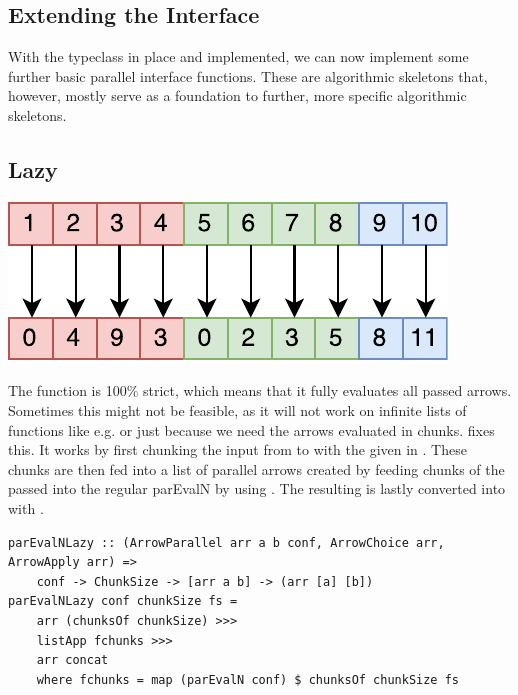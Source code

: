\subsection{Extending the Interface}
\label{sec:extending-interface}
With the  typeclass in place and implemented, we can now implement some further basic parallel interface functions. These are algorithmic skeletons that, however, mostly serve as a foundation to further, more specific algorithmic skeletons.

\subsection{Lazy }
\begin{center}
	\includegraphics[scale=0.7]{images/parEvalNLazy}
\end{center}
The function  is 100\% strict, which means that it fully evaluates all passed arrows. Sometimes this might not be feasible, as it will not work on infinite lists of functions like e.g.  or just because we need the arrows evaluated in chunks.  fixes this. It works by first chunking the input from \code{[a]} to \code{[[a]]} with the given  in . These chunks are then fed into a list \code{[arr [a] [b]]} of parallel arrows created by feeding chunks of the passed  into the regular parEvalN by using . The resulting \code{[[b]]} is lastly converted into \code{[b]} with .
\begin{lstlisting}[frame=htrbl]
parEvalNLazy :: (ArrowParallel arr a b conf, ArrowChoice arr, ArrowApply arr) =>
	conf -> ChunkSize -> [arr a b] -> (arr [a] [b])
parEvalNLazy conf chunkSize fs =
	arr (chunksOf chunkSize) >>>
	listApp fchunks >>>
	arr concat
	where fchunks = map (parEvalN conf) $ chunksOf chunkSize fs
\end{lstlisting} %

